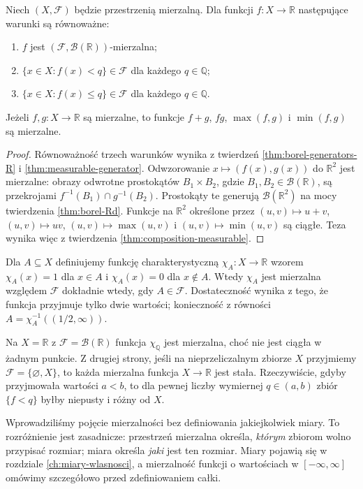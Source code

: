 \begin{twierdzenie}
\label{thm:measurable-real}
Niech $(X,\mathcal F)$ będzie przestrzenią mierzalną.
Dla funkcji $f:X\to\mathbb R$ następujące warunki są równoważne:
\begin{enumerate}
\item $f$ jest $(\mathcal F,\mathcal B(\mathbb R))$-mierzalna;
\item $\{x\in X:f(x)<q\}\in\mathcal F$ dla każdego $q\in\mathbb Q$;
\item $\{x\in X:f(x)\leq q\}\in\mathcal F$ dla każdego $q\in\mathbb Q$.
\end{enumerate}
Jeżeli $f,g:X\to\mathbb R$ są mierzalne, to funkcje
$f+g$, $fg$, $\max(f,g)$ i $\min(f,g)$ są mierzalne.
\end{twierdzenie}
\begin{proof}
Równoważność trzech warunków wynika z twierdzeń
\ref{thm:borel-generators-R} i \ref{thm:measurable-generator}.
Odwzorowanie $x\mapsto(f(x),g(x))$ do $\mathbb R^2$ jest mierzalne:
obrazy odwrotne prostokątów $B_1\times B_2$, gdzie
$B_1,B_2\in\mathcal B(\mathbb R)$, są przekrojami
$f^{-1}(B_1)\cap g^{-1}(B_2)$. Prostokąty te generują
$\mathcal B(\mathbb R^2)$ na mocy twierdzenia
\ref{thm:borel-Rd}. Funkcje na $\mathbb R^2$ określone przez
$(u,v)\mapsto u+v$, $(u,v)\mapsto uv$,
$(u,v)\mapsto\max(u,v)$ i $(u,v)\mapsto\min(u,v)$ są ciągłe.
Teza wynika więc z twierdzenia \ref{thm:composition-measurable}.
\end{proof}

\begin{przyklad}
Dla $A\subseteq X$ definiujemy funkcję charakterystyczną
$\chi_A:X\to\mathbb R$ wzorem
$\chi_A(x)=1$ dla $x\in A$ i $\chi_A(x)=0$ dla $x\notin A$.
Wtedy $\chi_A$ jest mierzalna względem $\mathcal F$
dokładnie wtedy, gdy $A\in\mathcal F$.
Dostateczność wynika z tego, że funkcja przyjmuje tylko dwie
wartości; konieczność z równości
$A=\chi_A^{-1}((1/2,\infty))$.
\end{przyklad}

\begin{przyklad}
Na $X=\mathbb R$ z $\mathcal F=\mathcal B(\mathbb R)$ funkcja
$\chi_{\mathbb Q}$ jest mierzalna, choć nie jest ciągła
w żadnym punkcie. Z drugiej strony, jeśli na nieprzeliczalnym
zbiorze $X$ przyjmiemy $\mathcal F=\{\varnothing,X\}$, to
każda mierzalna funkcja $X\to\mathbb R$ jest stała. Rzeczywiście,
gdyby przyjmowała wartości $a<b$, to dla pewnej liczby wymiernej
$q\in(a,b)$ zbiór $\{f<q\}$ byłby niepusty i różny od $X$.
\end{przyklad}

\begin{uwaga}
Wprowadziliśmy pojęcie mierzalności bez definiowania jakiejkolwiek
miary. To rozróżnienie jest zasadnicze: przestrzeń mierzalna określa,
\emph{którym} zbiorom wolno przypisać rozmiar; miara określa
\emph{jaki} jest ten rozmiar. Miary pojawią się w rozdziale
\ref{ch:miary-wlasnosci}, a mierzalność funkcji o wartościach
w $[-\infty,\infty]$ omówimy szczegółowo przed zdefiniowaniem całki.
\end{uwaga}